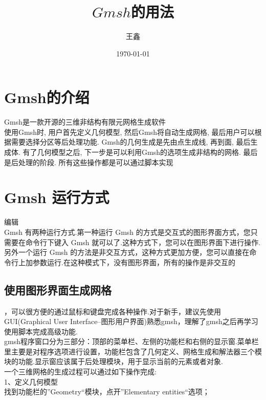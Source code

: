 \documentclass[12pt]{article}
\begin{document}
\begin{CJK}{UTF8}{gkai}
    \title{$Gmsh$的用法}
    \date{\today}
    \author{王鑫}
    \maketitle
    \section{Gmsh的介绍} 
    \qquad Gmsh是一款开源的三维非结构有限元网格生成软件\\   
    
    使用Gmsh时, 用户首先定义几何模型, 然后Gmsh将自动生成网格, 最后用户可以根据需要选择分区等后处理功能. Gmsh的几何生成是先由点生成线, 再到面, 最后生成体. 有了几何模型之后, 下一步是可以利用Gmsh的选项生成非结构的网格. 最后是后处理的阶段. 所有这些操作都是可以通过脚本实现\\
    \section{Gmsh 运行方式}
    
    编辑\\
    Gmsh 有两种运行方式.第一种运行 Gmsh 的方式是交互式的图形界面方式，您只需要在命令行下键入 Gmsh 就可以了.这种方式下，您可以在图形界面下进行操作.另外一个运行 Gmsh 的方法是非交互方式，这种方式更加方便，您可以直接在命令行上加参数运行.在这种模式下，没有图形界面，所有的操作是非交互的\\
	\subsection{使用图形界面生成网格}
	
	，可以很方便的通过鼠标和键盘完成各种操作.对于新手，建议先使用GUI(Graphical User Interface--图形用户界面)熟悉gmsh，理解了gmsh之后再学习使用脚本完成高级功能.\\
	
	gmsh程序窗口分为三部分：顶部的菜单栏、左侧的功能栏和右侧的显示窗.菜单栏里主要是对程序选项进行设置，功能栏包含了几何定义、网格生成和解法器三个模块的功能.显示窗应该属于后处理模块，用于显示当前的元素或者对象.\\
	
	一个三维网格的生成过程可以通过如下操作完成:\\
	
	1、定义几何模型\\
	
	找到功能栏的”Geometry“模块，点开”Elementary entities“选项；\\
	

\end{CJK}
\end{document}
